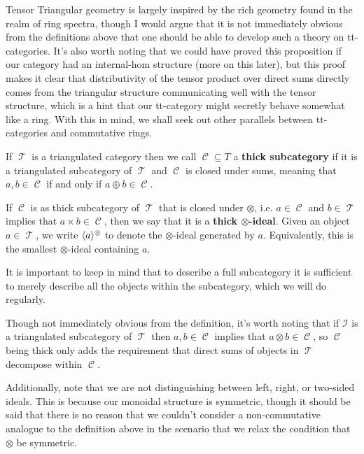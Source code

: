 \documentclass[11pt]{article}
\DeclareMathOperator{\CC}{\mathcal{C}}
\DeclareMathOperator{\TT}{\mathcal{T}}
\begin{document}
\begin{rmk}
Tensor Triangular geometry is largely inspired by the rich geometry found in the realm of ring spectra, though I would argue that it is not immediately obvious from the definitions above that one should be able to develop such a theory on tt-categories. It's also worth noting that we could have proved this proposition if our category had an internal-hom structure (more on this later), but this proof makes it clear that distributivity of the tensor product over direct sums directly comes from the triangular structure communicating well with the tensor structure, which is a hint that our tt-category might secretly behave somewhat like a ring. With this in mind, we shall seek out other parallels between tt-categories and commutative rings.
\end{rmk}

\begin{defn}
If $\TT$ is a triangulated category then we call $\CC \subseteq T$ a \textbf{thick subcategory} if it is a triangulated subcategory of $\TT$ and $\CC$ is closed under sums, meaning that $a,b \in \CC$ if and only if $a \oplus b \in \CC$.

If $\CC$ is as thick subcategory of $\TT$ that is closed under $\otimes$, i.e. $a \in \CC$ and $b \in \TT$ implies that $a \times b \in \CC$, then we say that it is a \textbf{thick $\otimes$-ideal}. Given an object $a \in \TT$, we write $\langle a \rangle^\otimes$ to denote the $\otimes$-ideal generated by $a$. Equivalently, this is the smallest $\otimes$-ideal containing $a$.

It is important to keep in mind that to describe a full subcategory it is sufficient to merely describe all the objects within the subcategory, which we will do regularly.

\end{defn}

\begin{rmk}
Though not immediately obvious from the definition, it's worth noting that if $\mathcal{I}$ is a triangulated subcategory of $\TT$ then $a,b \in \CC$ implies that $a \otimes b \in \CC$, so $\CC$ being thick only adds the requirement that direct sums of objects in $\TT$ decompose within $\CC$.

Additionally, note that we are not distinguishing between left, right, or two-sided ideals. This is because our monoidal structure is symmetric, though it should be said that there is no reason that we couldn't consider a non-commutative analogue to the definition above in the scenario that we relax the condition that $\otimes$ be symmetric.
\end{rmk}
\end{document}
